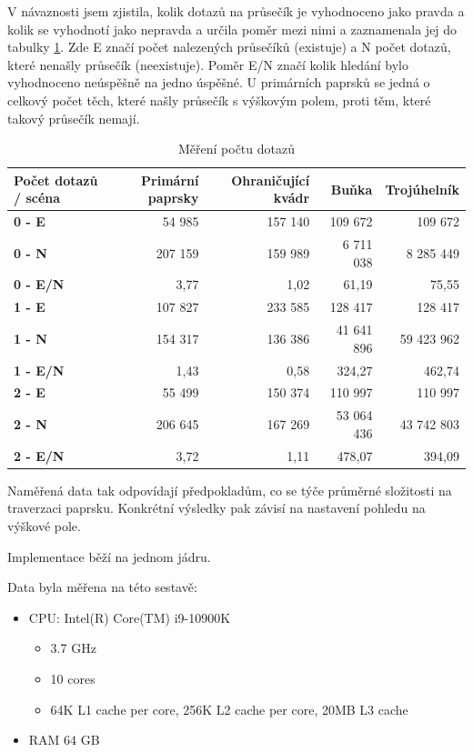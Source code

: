 \documentclass[report,11pt]{elsarticle}
\begin{document}
V návaznosti jsem zjistila, kolik dotazů na průsečík je vyhodnoceno jako pravda a kolik se vyhodnotí jako nepravda a určila poměr mezi nimi a zaznamenala jej do tabulky \ref{tab:measurementN3}. Zde E značí počet nalezených průsečíků (existuje) a N počet dotazů, které nenašly průsečík (neexistuje). Poměr E/N značí kolik hledání bylo vyhodnoceno neúspěšně na jedno úspěšné. U primárních paprsků se jedná o celkový počet těch, které našly průsečík s výškovým polem, proti těm, které takový průsečík nemají.

\begin{table}
\begin{tabular}{| l || r | r | r | r |}
\hline\bfseries Počet dotazů / scéna &  \bfseries Primární paprsky &  \bfseries Ohraničující kvádr &  \bfseries Buňka &  \bfseries Trojúhelník \\ \hline

\bfseries 0 - E  & 54 985 & 157 140 & 109 672 & 109 672 \\
\bfseries 0 - N  & 207 159 & 159 989 & 6 711 038 & 8 285 449 \\
\bfseries 0 - E/N  & 3,77 & 1,02 & 61,19 & 75,55 \\ \hline

\bfseries 1 - E  & 107 827 & 233 585 & 128 417 & 128 417 \\
\bfseries 1 - N  & 154 317 & 136 386 & 41 641 896 & 59 423 962 \\
\bfseries 1 - E/N  & 1,43 & 0,58 & 324,27 & 462,74 \\ \hline

\bfseries 2 - E  & 55 499 & 150 374 & 110 997 & 110 997 \\
\bfseries 2 - N  & 206 645 & 167 269 & 53 064 436 & 43 742 803 \\
\bfseries 2 - E/N  & 3,72 & 1,11 & 478,07 & 394,09\\ \hline
\end{tabular}
\caption{Měření počtu dotazů}
\label{tab:measurementN3}
\end{table}

Naměřená data tak odpovídají předpokladům, co se týče průměrné složitosti na traverzaci paprsku. Konkrétní výsledky pak závisí na nastavení pohledu na výškové pole.

Implementace běží na jednom jádru.

Data byla měřena na této sestavě:
\begin{itemize}
    \item CPU: Intel(R) Core(TM) i9-10900K
    \begin{itemize}
        \item 3.7 GHz
        \item 10 cores
        \item 64K L1 cache per core, 256K L2 cache per core, 20MB L3 cache
    \end{itemize}
    \item RAM 64 GB
\end{itemize}
\end{document}
